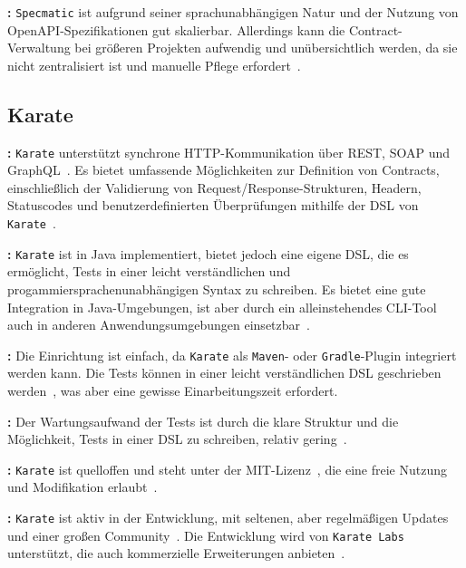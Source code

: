 \textbf{:} \texttt{Specmatic} ist aufgrund seiner sprachunabhängigen Natur und der Nutzung von \gls{OpenAPI}-Spezifikationen gut skalierbar.
Allerdings kann die Contract-Verwaltung bei größeren Projekten aufwendig und unübersichtlich werden, da sie nicht zentralisiert ist und manuelle Pflege erfordert~\cite{SpecmaticDocumentationContract}.


\subsection*{Karate}

\textbf{:} \texttt{Karate} unterstützt synchrone \gls{HTTP}-Kommunikation über \gls{REST}, \gls{SOAP} und \gls{GraphQL}~\cite{OpenSourceSolution}.
Es bietet umfassende Möglichkeiten zur Definition von Contracts, einschließlich der Validierung von Request/Response-Strukturen, Headern, Statuscodes und benutzerdefinierten Überprüfungen mithilfe der \gls{DSL} von \texttt{Karate}~\cite{KaratelabsKarate2025}.

\textbf{:} \texttt{Karate} ist in Java implementiert, bietet jedoch eine eigene \gls{DSL}, die es ermöglicht, Tests in einer leicht verständlichen und progammiersprachenunabhängigen Syntax zu schreiben.
Es bietet eine gute Integration in Java-Umgebungen, ist aber durch ein alleinstehendes \gls{CLI}-Tool auch in anderen Anwendungsumgebungen einsetzbar~\cite{KaratelabsKarate2025}.

\textbf{:} Die Einrichtung ist einfach, da \texttt{Karate} als \texttt{\gls{Maven}}- oder \texttt{\gls{Gradle}}-Plugin integriert werden kann.
Die Tests können in einer leicht verständlichen \gls{DSL} geschrieben werden~\cite{OpenSourceSolution}, was aber eine gewisse Einarbeitungszeit erfordert.

\textbf{:} Der Wartungsaufwand der Tests ist durch die klare Struktur und die Möglichkeit, Tests in einer \gls{DSL} zu schreiben, relativ gering~\cite{KaratelabsKarate2025}.

\textbf{:} \texttt{Karate} ist quelloffen und steht unter der \gls{MIT}-Lizenz~\cite{KaratelabsKarate2025}, die eine freie Nutzung und Modifikation erlaubt~\cite{MITLicense}.

\textbf{:} \texttt{Karate} ist aktiv in der Entwicklung, mit seltenen, aber regelmäßigen Updates und einer großen Community~\cite{KaratelabsKarate2025}.
Die Entwicklung wird von \texttt{Karate Labs} unterstützt, die auch kommerzielle Erweiterungen anbieten~\cite{OriginKarateKarate}.


